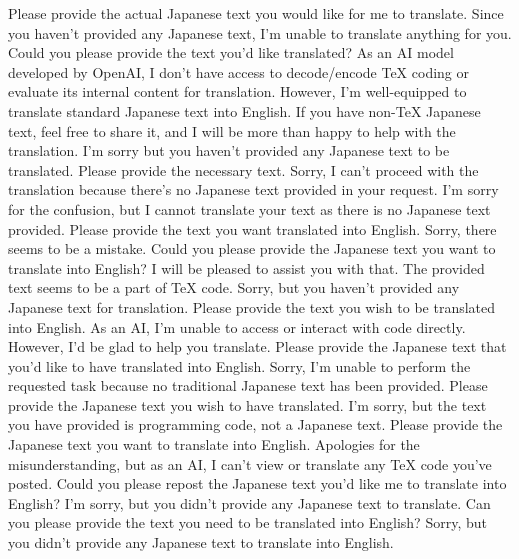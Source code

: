 {Please provide the actual Japanese text you would like for me to translate.
Since you haven't provided any Japanese text, I'm unable to translate anything for you. Could you please provide the text you'd like translated?
As an AI model developed by OpenAI, I don't have access to decode/encode TeX coding or evaluate its internal content for translation. However, I'm well-equipped to translate standard Japanese text into English. If you have non-TeX Japanese text, feel free to share it, and I will be more than happy to help with the translation.
I'm sorry but you haven't provided any Japanese text to be translated. Please provide the necessary text.
Sorry, I can't proceed with the translation because there's no Japanese text provided in your request.
I'm sorry for the confusion, but I cannot translate your text as there is no Japanese text provided. Please provide the text you want translated into English.
Sorry, there seems to be a mistake. Could you please provide the Japanese text you want to translate into English? I will be pleased to assist you with that. The provided text seems to be a part of TeX code.
Sorry, but you haven't provided any Japanese text for translation. Please provide the text you wish to be translated into English.
As an AI, I'm unable to access or interact with code directly. However, I'd be glad to help you translate. Please provide the Japanese text that you'd like to have translated into English.
Sorry, I'm unable to perform the requested task because no traditional Japanese text has been provided. Please provide the Japanese text you wish to have translated.
I'm sorry, but the text you have provided is programming code, not a Japanese text. Please provide the Japanese text you want to translate into English.
Apologies for the misunderstanding, but as an AI, I can't view or translate any TeX code you've posted. Could you please repost the Japanese text you'd like me to translate into English?
I'm sorry, but you didn't provide any Japanese text to translate. Can you please provide the text you need to be translated into English?
Sorry, but you didn't provide any Japanese text to translate into English.
}
